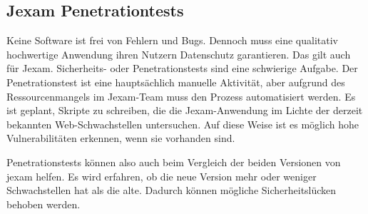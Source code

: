 \subsection{Jexam Penetrationtests}

Keine Software ist frei von Fehlern und Bugs. Dennoch muss eine qualitativ
hochwertige Anwendung ihren Nutzern Datenschutz garantieren. Das gilt
auch f\"ur Jexam. Sicherheits- oder Penetrationstests sind eine schwierige
Aufgabe. Der Penetrationstest ist eine haupts\"achlich manuelle Aktivit\"at,
aber aufgrund des Ressourcenmangels im Jexam-Team muss den Prozess
automatisiert werden. Es ist geplant, Skripte zu schreiben, die die
Jexam-Anwendung im Lichte der derzeit bekannten Web-Schwachstellen
untersuchen. Auf diese Weise ist es m\"oglich hohe Vulnerabilit\"aten
erkennen, wenn sie vorhanden sind.


Penetrationstests k\"onnen also auch beim Vergleich der beiden Versionen von
jexam helfen. Es wird erfahren, ob die neue Version mehr oder weniger
Schwachstellen hat als die alte. Dadurch k\"onnen m\"ogliche
Sicherheitsl\"ucken behoben werden.

